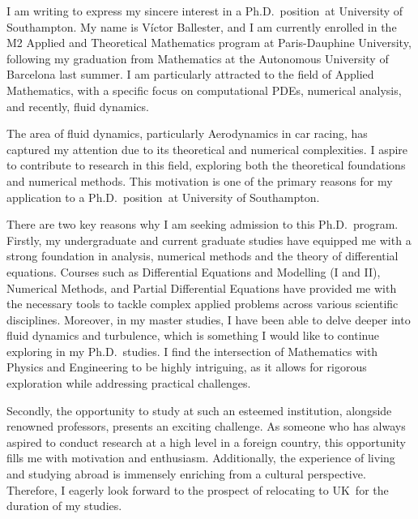 \documentclass{letter}
\newcommand{\program}{Ph.D.\ position}
\newcommand{\uni}{University of Southampton}
\newcommand{\city}{UK}
\begin{document}
\begin{letter}




  I am writing to express my sincere interest in a \program\ at \uni. My name is Víctor Ballester, and I am currently enrolled in the M2 Applied and Theoretical Mathematics program at Paris-Dauphine University, following my graduation from Mathematics at the Autonomous University of Barcelona last summer. I am particularly attracted to the field of Applied Mathematics, with a specific focus on computational PDEs, numerical analysis, and recently, fluid dynamics.


  The area of fluid dynamics, particularly Aerodynamics in car racing, has captured my attention due to its theoretical and numerical complexities. I aspire to contribute to research in this field, exploring both the theoretical foundations and numerical methods. This motivation is one of the primary reasons for my application to a \program\ at \uni.


  There are two key reasons why I am seeking admission to this Ph.D.\ program. Firstly, my undergraduate and current graduate studies have equipped me with a strong foundation in analysis, numerical methods and the theory of differential equations. Courses such as Differential Equations and Modelling (I and II), Numerical Methods, and Partial Differential Equations have provided me with the necessary tools to tackle complex applied problems across various scientific disciplines. Moreover, in my master studies, I have been able to delve deeper into fluid dynamics and turbulence, which is something I would like to continue exploring in my Ph.D.\ studies.
  I find the intersection of Mathematics with Physics and Engineering to be highly intriguing, as it allows for rigorous exploration while addressing practical challenges.

  Secondly, the opportunity to study at such an esteemed institution, alongside renowned professors, presents an exciting challenge. As someone who has always aspired to conduct research at a high level in a foreign country, this opportunity fills me with motivation and enthusiasm. Additionally, the experience of living and studying abroad is immensely enriching from a cultural perspective. Therefore, I eagerly look forward to the prospect of relocating to \city\ for the duration of my studies.


\end{letter}
\end{document}

